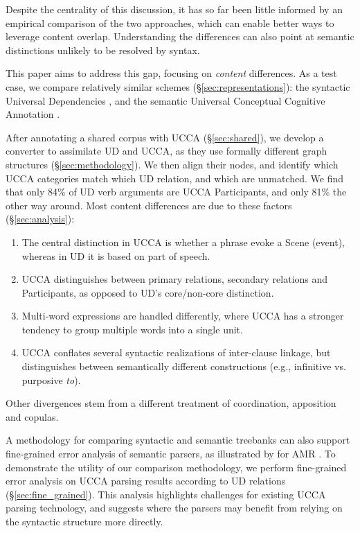 \documentclass[11pt,a4paper]{article}
\begin{document}
  Despite the centrality of this discussion, it has so far been little informed by an empirical
  comparison of the two approaches,
  which can enable better ways to leverage content overlap.
  Understanding the differences can also
  point at semantic distinctions unlikely to be resolved by syntax.

  This paper aims to address this gap,
  focusing on {\it content} differences.
  As a test case, we compare relatively similar schemes (\S\ref{sec:representations}):
  the syntactic Universal Dependencies \cite[UD; ][]{nivre2016universal},
  and the semantic Universal Conceptual Cognitive Annotation \cite[UCCA; ][]{abend2013universal}.

  After annotating a shared corpus with UCCA (\S\ref{sec:shared}),
  we develop a converter to assimilate UD and UCCA,
  as they use formally different graph structures
  (\S\ref{sec:methodology}).
  We then align their nodes,
  and identify which UCCA categories match which UD relation,
  and which are unmatched.
  We find that only 84\% of UD verb arguments are UCCA Participants,
  and only 81\% the other way around.
  Most content differences are due to these
  factors (\S\ref{sec:analysis}):

  \begin{enumerate}[noitemsep]
      \item The central distinction in UCCA is whether a phrase evoke a Scene (event),
        whereas in UD it is based on part of speech. %
      \item UCCA distinguishes between primary relations, secondary relations
      and Participants, as opposed to UD's core/non-core distinction. %
      \item Multi-word expressions are handled differently,
        where UCCA has a stronger tendency to group multiple 
        words into a single unit. %
      \item UCCA conflates several syntactic realizations of inter-clause linkage,
      but distinguishes between semantically different constructions
      (e.g., infinitive vs. purposive \textit{to}). %
   \end{enumerate}
    
   Other divergences stem from a different treatment of coordination, apposition and copulas.%
  
  
  A methodology for comparing syntactic and semantic treebanks can also support fine-grained error 
  analysis of semantic parsers, as illustrated by \citet{szubert2018structured} 
  for AMR \citep{banarescu2013abstract}.
  To demonstrate the utility of our comparison methodology,
  we perform fine-grained error analysis on UCCA parsing results
  according to UD relations (\S\ref{sec:fine_grained}).
  This analysis highlights challenges for existing UCCA parsing technology,
  and suggests where the parsers may benefit from relying on the syntactic structure more directly.
\end{document}
